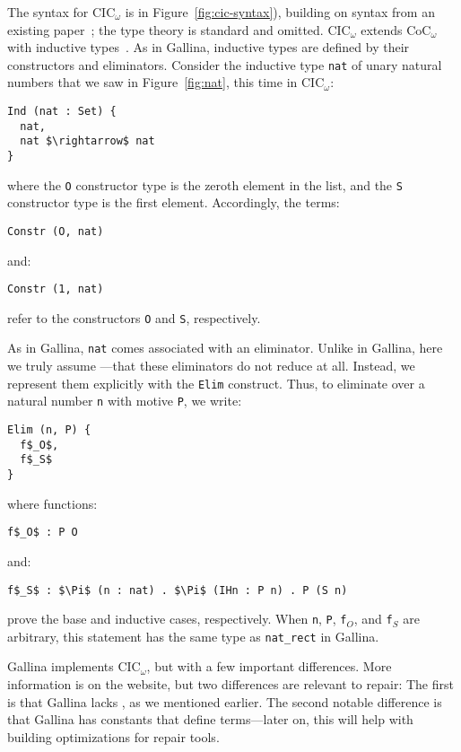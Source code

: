 The syntax for CIC$_{\omega}$ is in Figure~\ref{fig:cic-syntax}), building on syntax from an existing paper~\cite{Timany2015FirstST};
the type theory is standard and omitted. %
CIC$_{\omega}$ extends CoC$_{\omega}$ with inductive types~\cite{inductive}.
As in Gallina, inductive types are defined by their constructors and eliminators.
Consider the inductive type \lstinline{nat} of unary natural numbers that we saw in Figure~\ref{fig:nat},
this time in CIC$_{\omega}$: %

\begin{lstlisting}
Ind (nat : Set) {
  nat,
  nat $\rightarrow$ nat
}
\end{lstlisting}
where the \lstinline{O} constructor type is the zeroth element in the list, and the \lstinline{S} constructor type is the first element.
Accordingly, the terms:

\begin{lstlisting}
Constr (O, nat)
\end{lstlisting}
and:

\begin{lstlisting}
Constr (1, nat)
\end{lstlisting}
refer to the constructors \lstinline{O} and \lstinline{S}, respectively.

As in Gallina, \lstinline{nat} comes associated with an eliminator.
Unlike in Gallina, here we truly assume ---that these eliminators
do not reduce at all.
Instead, we represent them explicitly with the \lstinline{Elim} construct.
Thus, to eliminate over a natural number \lstinline{n} with motive \lstinline{P},
we write: %

\begin{lstlisting}
Elim (n, P) {
  f$_O$,
  f$_S$
}
\end{lstlisting}
where functions:

\begin{lstlisting}
f$_O$ : P O
\end{lstlisting}
and:

\begin{lstlisting}
f$_S$ : $\Pi$ (n : nat) . $\Pi$ (IHn : P n) . P (S n)
\end{lstlisting}
prove the base and inductive cases, respectively.
When \lstinline{n}, \lstinline{P}, \lstinline{f}$_O$, and \lstinline{f}$_S$ are arbitrary,
this statement has the same type as \lstinline{nat_rect} in Gallina.

Gallina implements CIC$_{\omega}$, but with a few important differences.
More information is on the website, %
but two differences are relevant to repair:
The first is that Gallina lacks , as we mentioned earlier.
The second notable difference is that Gallina has constants that define terms---later on, this will help with building optimizations for repair tools.

